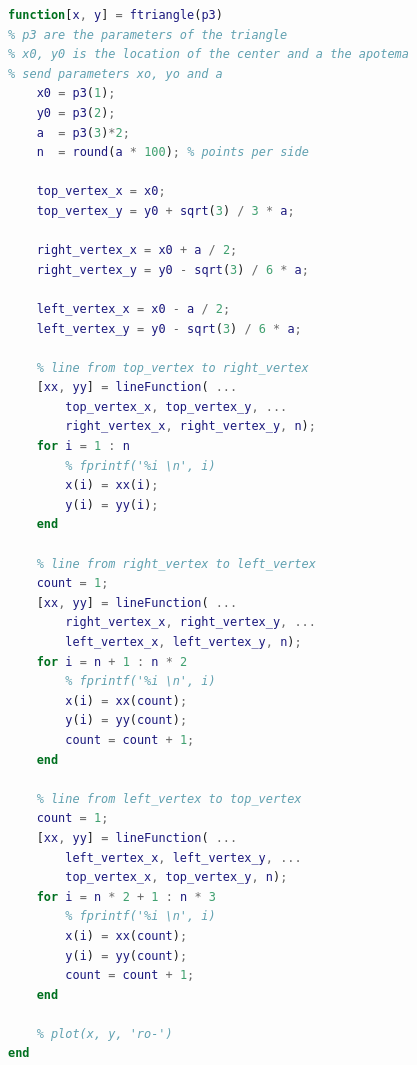 \documentclass{article}
\begin{document}
\begin{lstlisting}[language=Matlab, caption=Function to draw a triangle, label=lis:triangleGeneration]
% https://math.stackexchange.com/questions/1344690/is-it-possible-to-find-the-vertices-of-an-equilateral-triangle-given-its-center
function[x, y] = ftriangle(p3)
% p3 are the parameters of the triangle
% x0, y0 is the location of the center and a the apotema
% send parameters xo, yo and a
    x0 = p3(1);
    y0 = p3(2);
    a  = p3(3)*2;
    n  = round(a * 100); % points per side
    
    top_vertex_x = x0;
    top_vertex_y = y0 + sqrt(3) / 3 * a;
    
    right_vertex_x = x0 + a / 2;
    right_vertex_y = y0 - sqrt(3) / 6 * a;
    
    left_vertex_x = x0 - a / 2;
    left_vertex_y = y0 - sqrt(3) / 6 * a;
    
    % line from top_vertex to right_vertex
    [xx, yy] = lineFunction( ...
        top_vertex_x, top_vertex_y, ...
        right_vertex_x, right_vertex_y, n);
    for i = 1 : n
        % fprintf('%i \n', i)
        x(i) = xx(i);
        y(i) = yy(i);
    end
    
    % line from right_vertex to left_vertex
    count = 1;
    [xx, yy] = lineFunction( ...
        right_vertex_x, right_vertex_y, ...
        left_vertex_x, left_vertex_y, n);
    for i = n + 1 : n * 2
        % fprintf('%i \n', i)
        x(i) = xx(count);
        y(i) = yy(count);
        count = count + 1;
    end
    
    % line from left_vertex to top_vertex
    count = 1;
    [xx, yy] = lineFunction( ...
        left_vertex_x, left_vertex_y, ...
        top_vertex_x, top_vertex_y, n);
    for i = n * 2 + 1 : n * 3
        % fprintf('%i \n', i)
        x(i) = xx(count);
        y(i) = yy(count);
        count = count + 1;
    end

    % plot(x, y, 'ro-')
end
\end{lstlisting}

\printbibliography[title={References}]
\end{document}
